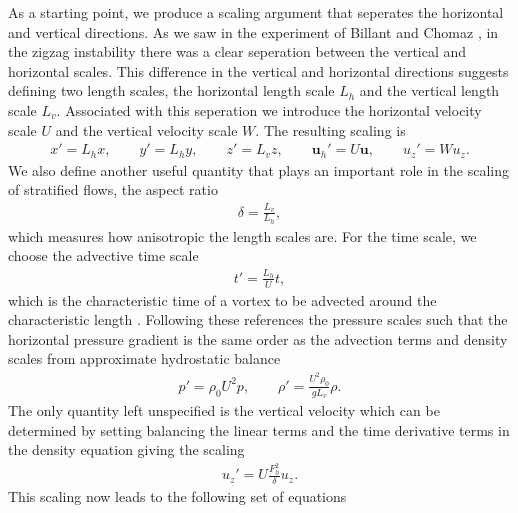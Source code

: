 As a starting point, we produce a scaling argument that seperates the horizontal and vertical directions. As we saw in the experiment of Billant and Chomaz \cite{bc2000a}, in the zigzag instability there was a clear seperation between the vertical and horizontal scales. This difference in the vertical and horizontal directions suggests defining two length scales, the horizontal length scale $L_{h}$ and the vertical length scale $L_{v}$. Associated with this seperation we introduce the horizontal velocity scale $U$ and the vertical velocity scale $W$. The resulting scaling is
\begin{align}
x'=L_{h}x,\qquad y' =L_{h}y, \qquad z'=L_{v}z, \qquad \textbf{u}_{h}' = U\textbf{u}, \qquad u_{z}' = Wu_{z}.
\end{align}
We also define another useful quantity that plays an important role in the scaling of stratified flows, the aspect ratio
\begin{align}
\delta = \frac{L_{v}}{L_{h}},
\end{align}
which measures how anisotropic the length scales are. For the time scale, we choose the advective time scale 
\begin{align}
t' = \frac{L_{h}}{U}t,
\end{align}
which is the characteristic time of a vortex to be advected around the characteristic length \cite{rileylelong2000,bc2001,lilly1983}. Following these references the pressure scales such that the horizontal pressure gradient is the same order as the advection terms and density scales from approximate hydrostatic balance
\begin{align}
p' = \rho_{0}U^{2}p, \qquad \rho' = \frac{U^{2}\rho_{0}}{gL_{v}}\rho.
\end{align}
The only quantity left unspecified is the vertical velocity which can be determined by setting balancing the linear terms and the time derivative terms in the density equation \cite{bc2001,rileylelong2000} giving the scaling 
 \begin{align}
u_{z}' = U\frac{F_{h}^{2}}{\delta}u_{z}.
\end{align}
This scaling now leads to the following set of equations \cite{rileylindborg2013}

